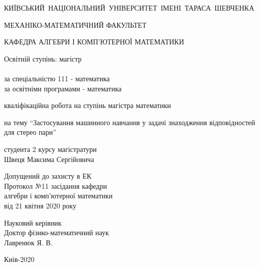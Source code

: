 \documentclass{article}
\theoremstyle{definition}
\begin{document}
\begin{titlepage}
	{
		\centering \mbox{КИЇВСЬКИЙ НАЦІОНАЛЬНИЙ УНІВЕРСИТЕТ ІМЕНІ ТАРАСА ШЕВЧЕНКА}
		
		\centering МЕХАНІКО-МАТЕМАТИЧНИЙ ФАКУЛЬТЕТ
		
		\centering КАФЕДРА АЛГЕБРИ І КОМП’ЮТЕРНОЇ МАТЕМАТИКИ
		
	}
	
	\vspace{30pt}

	\noindent
	Освітній ступінь: магістр \\ \\
	за спеціальністю 111 - математика \\
	за освітніми програмами - математика
	
	\vspace{30pt}
	
	{
		\noindent \centering кваліфікаційна робота на ступінь магістра математики
		
		\noindent \centering на тему “Застосування машинного навчання у задачі знаходження відповідностей для стерео пари”
		
	}
	
	\vspace{30pt}
	
	\begin{flushright}
		студента 2 курсу магістратури \\
		Швеця Максима Сергійовича
	\end{flushright}

	\vspace{30pt}

	\noindent
	Допущений до захисту в ЕК \\
	Протокол №11 засідання кафедри \\
	алгебри і комп’ютерної математики \\
	від 21 квітня 2020 року
	
	\vspace{30pt}
	
	\begin{flushright}
		Науковий керівник \\
		Доктор фізико-математичний наук \\
		Лавренюк Я. В.
	\end{flushright}

	\vspace*{\fill}
	\centering Киів-2020
\end{titlepage}

\newpage
\end{document}
